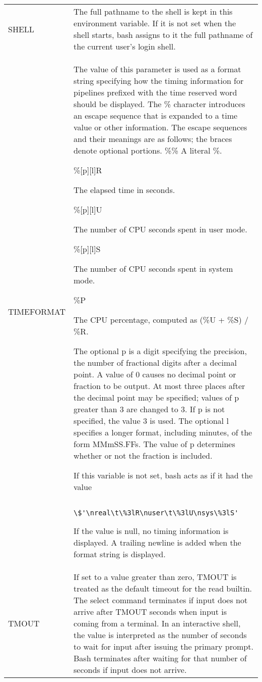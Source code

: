 \documentclass[11pt]{article}
\begin{document}
\begin{longtable}{p{}p{}}
SHELL &
The full pathname to the shell is kept in this environment variable. If it is not set when the shell starts, bash assigns to it the full pathname of the current user's login shell. \\

TIMEFORMAT &
The value of this parameter is used as a format string specifying how the timing information for pipelines prefixed with the time reserved word should be displayed. The \% character introduces an escape sequence that is expanded to a time value or other information. The escape sequences and their meanings are as follows; the braces denote optional portions.
    \%\%
A literal \%.

    \%[p][l]R

The elapsed time in seconds.

    \%[p][l]U

The number of CPU seconds spent in user mode.

    \%[p][l]S

The number of CPU seconds spent in system mode.

    \%P

The CPU percentage, computed as (\%U + \%S) / \%R.

The optional p is a digit specifying the precision, the number of fractional digits after a decimal point. A value of 0 causes no decimal point or fraction to be output. At most three places after the decimal point may be specified; values of p greater than 3 are changed to 3. If p is not specified, the value 3 is used.
The optional l specifies a longer format, including minutes, of the form MMmSS.FFs. The value of p determines whether or not the fraction is included.

If this variable is not set, bash acts as if it had the value 
\begin{lstlisting}
    \$'\nreal\t\%3lR\nuser\t\%3lU\nsys\%3lS'
\end{lstlisting}
        
If the value is null, no timing information is displayed. A trailing newline is added when the format string is displayed. \\

TMOUT &
If set to a value greater than zero, TMOUT is treated as the default timeout for the read builtin. The select command terminates if input does not arrive after TMOUT seconds when input is coming from a terminal. In an interactive shell, the value is interpreted as the number of seconds to wait for input after issuing the primary prompt. Bash terminates after waiting for that number of seconds if input does not arrive. \\


\end{longtable}
\end{document}
